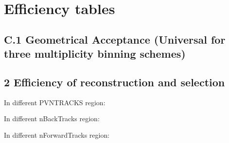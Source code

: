 \section{Efficiency tables} 
\label{sec:EffTables}
\subsection*{C.1 Geometrical Acceptance (Universal for three multiplicity binning schemes)}  




\subsection*{2 Efficiency of reconstruction and selection} 
In different PVNTRACKS region:




In different nBackTracks region:




In different nForwardTracks region:




